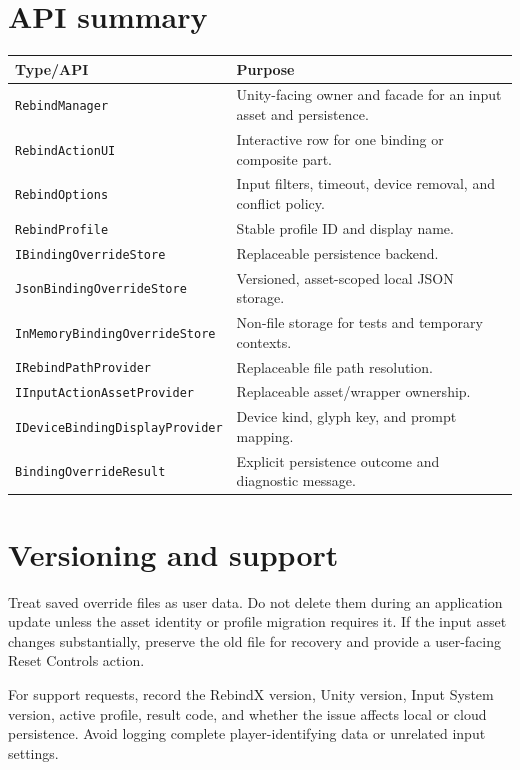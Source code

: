 \documentclass[11pt,a4paper]{article}
\newcommand{\class}[1]{\texttt{#1}}
\begin{document}
\section{API summary}
\begin{longtable}{p{}p{}}
\toprule
\textbf{Type/API} & \textbf{Purpose}\\
\midrule
\endhead
\class{RebindManager} & Unity-facing owner and facade for an input asset and persistence.\\
\class{RebindActionUI} & Interactive row for one binding or composite part.\\
\class{RebindOptions} & Input filters, timeout, device removal, and conflict policy.\\
\class{RebindProfile} & Stable profile ID and display name.\\
\class{IBindingOverrideStore} & Replaceable persistence backend.\\
\class{JsonBindingOverrideStore} & Versioned, asset-scoped local JSON storage.\\
\class{InMemoryBindingOverrideStore} & Non-file storage for tests and temporary contexts.\\
\class{IRebindPathProvider} & Replaceable file path resolution.\\
\class{IInputActionAssetProvider} & Replaceable asset/wrapper ownership.\\
\class{IDeviceBindingDisplayProvider} & Device kind, glyph key, and prompt mapping.\\
\class{BindingOverrideResult} & Explicit persistence outcome and diagnostic message.\\
\bottomrule
\end{longtable}

\section{Versioning and support}
Treat saved override files as user data. Do not delete them during an application update unless the asset identity or profile migration requires it. If the input asset changes substantially, preserve the old file for recovery and provide a user-facing Reset Controls action.

For support requests, record the RebindX version, Unity version, Input System version, active profile, result code, and whether the issue affects local or cloud persistence. Avoid logging complete player-identifying data or unrelated input settings.
\end{document}
